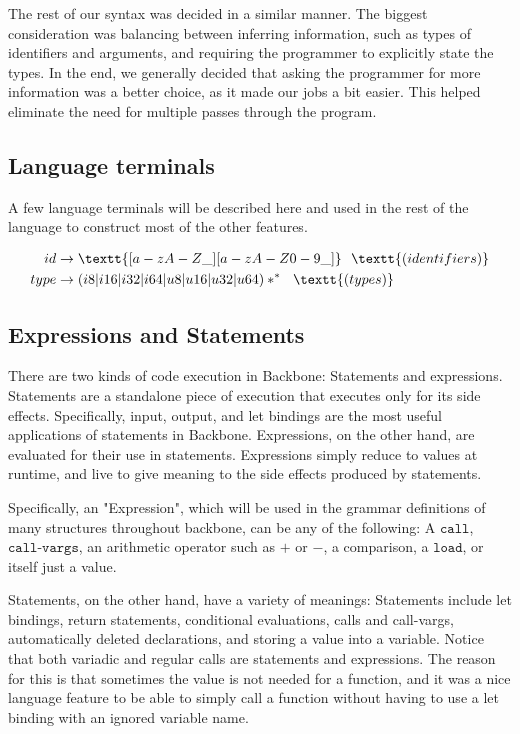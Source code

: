 \documentclass[journal=jacsat, manuscript=article]{achemso}
\begin{document}
The rest of our syntax was decided in a similar manner. The biggest consideration was balancing between inferring information, such as types of identifiers and arguments, and requiring the programmer to explicitly state the types. In the end, we generally decided that asking the programmer for more information was a better choice, as it made our jobs a bit easier. This helped eliminate the need for multiple passes through the program.

\subsection{Language terminals}

A few language terminals will be described here and used in the rest of the
language to construct most of the other features.

\begin{align}
    id &\rightarrow \textt{[a-zA-Z\_][a-zA-Z0-9\_]}\,\,\,\,\textt{(identifiers)}\\
    type &\rightarrow (i8|i16|i32|i64|u8|u16|u32|u64)*^*\,\,\,\,\textt{(types)} \\
\end{align}

\subsection{Expressions and Statements}

There are two kinds of code execution in Backbone: Statements and expressions.
Statements are a standalone piece of execution that executes only for its side effects.
Specifically, input, output, and let bindings are the most useful applications of
statements in Backbone. Expressions, on the other hand, are evaluated for their use in 
statements. Expressions simply reduce to values at runtime, and live to give meaning
to the side effects produced by statements.

Specifically, an "Expression", which will be used in the grammar definitions of
many structures throughout backbone, can be any of the following: A $\texttt{call}$, $\texttt{call-vargs}$, an arithmetic operator such as $+$ or $-$,
a comparison, a $\texttt{load}$, or itself just a value.

Statements, on the other hand, have a variety of meanings: Statements include let bindings,
return statements, conditional evaluations, calls and call-vargs, automatically deleted
declarations, and storing a value into a variable. Notice that both variadic and regular
calls are statements and expressions. The reason for this is that sometimes the value is not
needed for a function, and it was a nice language feature to be able to simply call a function
without having to use a let binding with an ignored variable name.
\end{document}
